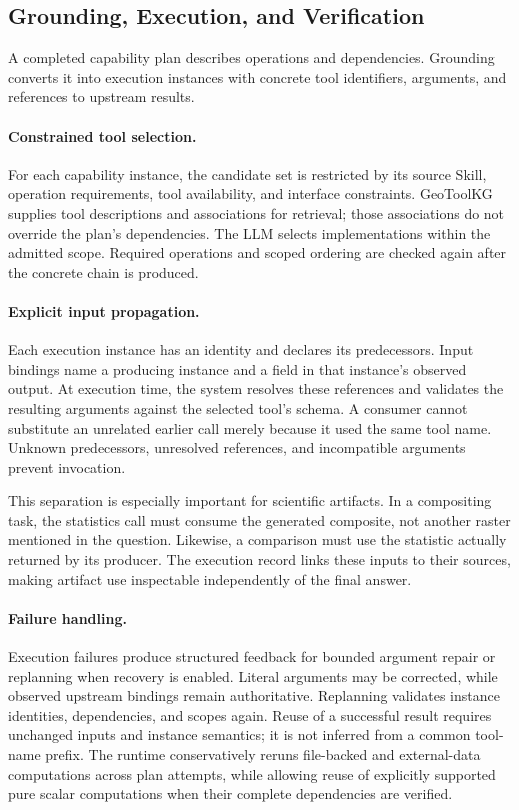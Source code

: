 \subsection{Grounding, Execution, and Verification}
\label{sec:execution}
A completed capability plan describes operations and dependencies. Grounding converts it into execution instances with concrete tool identifiers, arguments, and references to upstream results.

\paragraph{Constrained tool selection.}
For each capability instance, the candidate set is restricted by its source Skill, operation requirements, tool availability, and interface constraints. GeoToolKG supplies tool descriptions and associations for retrieval; those associations do not override the plan's dependencies. The LLM selects implementations within the admitted scope. Required operations and scoped ordering are checked again after the concrete chain is produced.

\paragraph{Explicit input propagation.}
Each execution instance has an identity and declares its predecessors. Input bindings name a producing instance and a field in that instance's observed output. At execution time, the system resolves these references and validates the resulting arguments against the selected tool's schema. A consumer cannot substitute an unrelated earlier call merely because it used the same tool name. Unknown predecessors, unresolved references, and incompatible arguments prevent invocation.

This separation is especially important for scientific artifacts. In a compositing task, the statistics call must consume the generated composite, not another raster mentioned in the question. Likewise, a comparison must use the statistic actually returned by its producer. The execution record links these inputs to their sources, making artifact use inspectable independently of the final answer.

\paragraph{Failure handling.}
Execution failures produce structured feedback for bounded argument repair or replanning when recovery is enabled. Literal arguments may be corrected, while observed upstream bindings remain authoritative. Replanning validates instance identities, dependencies, and scopes again. Reuse of a successful result requires unchanged inputs and instance semantics; it is not inferred from a common tool-name prefix. The runtime conservatively reruns file-backed and external-data computations across plan attempts, while allowing reuse of explicitly supported pure scalar computations when their complete dependencies are verified.

